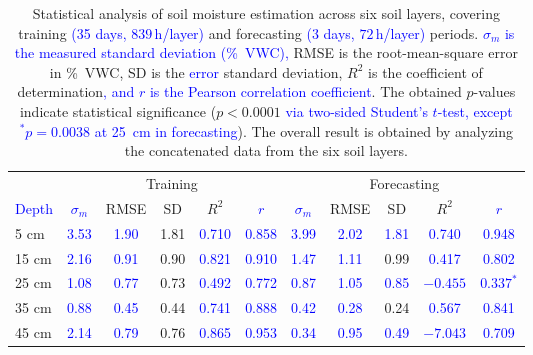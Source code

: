 \documentclass[pdflatex,sn-nature]{sn-jnl}%
\theoremstyle{thmstyleone}%
\theoremstyle{thmstyletwo}%
\theoremstyle{thmstylethree}%
\begin{document}
\begin{table}[!htbp]
\centering
{}\caption{Statistical analysis of soil moisture estimation across six soil layers, covering training \textcolor{blue}{(35 days, $839\,\mathrm{h}$/layer)} and forecasting \textcolor{blue}{(3 days, $72\,\mathrm{h}$/layer)} periods. \textcolor{blue}{$\sigma_m$ is the measured standard deviation (\si{\%VWC}),} RMSE is the root-mean-square error in \si{\%VWC}, SD is the \textcolor{blue}{error} standard deviation, $R^2$ is the coefficient of determination\textcolor{blue}{, and $r$ is the Pearson correlation coefficient}. The obtained $p$-values indicate statistical significance ($p < 0.0001$ \textcolor{blue}{via two-sided Student's $t$-test, except $^*p = 0.0038$ at 25~\si{cm} in forecasting}). The overall result is obtained by analyzing the concatenated data from the six soil layers.}
\label{tab:stats_combined}
\footnotesize
\setlength{\tabcolsep}{4.5pt}
\begin{tabular}{@{}lcccccccccc@{}}
\toprule
& \multicolumn{5}{c}{Training} & \multicolumn{5}{c}{Forecasting} \\
\cmidrule(lr){2-6}\cmidrule(l){7-11}
\textcolor{blue}{Depth} & \textcolor{blue}{$\sigma_m$} & RMSE & SD & $R^2$ & \textcolor{blue}{$r$} & \textcolor{blue}{$\sigma_m$} & RMSE & SD & $R^2$ & \textcolor{blue}{$r$} \\
\midrule
5 \si{cm}  & \textcolor{blue}{3.53} & \textcolor{blue}{1.90} & 1.81 & \textcolor{blue}{0.710} & \textcolor{blue}{0.858} & \textcolor{blue}{3.99} & \textcolor{blue}{2.02} & \textcolor{blue}{1.81} & \textcolor{blue}{0.740} & \textcolor{blue}{0.948} \\
15 \si{cm} & \textcolor{blue}{2.16} & \textcolor{blue}{0.91} & 0.90 & \textcolor{blue}{0.821} & \textcolor{blue}{0.910} & \textcolor{blue}{1.47} & \textcolor{blue}{1.11} & 0.99 & \textcolor{blue}{0.417} & \textcolor{blue}{0.802} \\
25 \si{cm} & \textcolor{blue}{1.08} & \textcolor{blue}{0.77} & 0.73 & \textcolor{blue}{0.492} & \textcolor{blue}{0.772} & \textcolor{blue}{0.87} & \textcolor{blue}{1.05} & \textcolor{blue}{0.85} & \textcolor{blue}{$-0.455$} & \textcolor{blue}{$0.337^*$} \\
35 \si{cm} & \textcolor{blue}{0.88} & \textcolor{blue}{0.45} & 0.44 & \textcolor{blue}{0.741} & \textcolor{blue}{0.888} & \textcolor{blue}{0.42} & \textcolor{blue}{0.28} & 0.24 & \textcolor{blue}{0.567} & \textcolor{blue}{0.841} \\
45 \si{cm} & \textcolor{blue}{2.14} & \textcolor{blue}{0.79} & 0.76 & \textcolor{blue}{0.865} & \textcolor{blue}{0.953} & \textcolor{blue}{0.34} & \textcolor{blue}{0.95} & \textcolor{blue}{0.49} & \textcolor{blue}{$-7.043$} & \textcolor{blue}{0.709} \\

\end{tabular}
\end{table}
\end{document}
